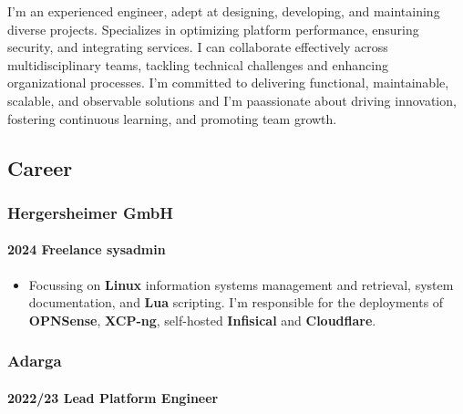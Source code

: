 \documentclass[
]{article}
\providecommand{\tightlist}{%
  \setlength{\itemsep}{0pt}\setlength{\parskip}{0pt}}
\begin{document}
I'm an experienced engineer, adept at designing, developing, and
maintaining diverse projects. Specializes in optimizing platform
performance, ensuring security, and integrating services. I can
collaborate effectively across multidisciplinary teams, tackling
technical challenges and enhancing organizational processes. I'm
committed to delivering functional, maintainable, scalable, and
observable solutions and I'm paassionate about driving innovation,
fostering continuous learning, and promoting team growth.

\hypertarget{material-briefcase-career}{%
\subsection{\texorpdfstring{\faBriefcase
Career}{ Career}}\label{material-briefcase-career}}

\hypertarget{material-office-building-hergersheimer-gmbh}{%
\subsubsection{\texorpdfstring{\faBuilding Hergersheimer
GmbH}{ Hergersheimer GmbH}}\label{material-office-building-hergersheimer-gmbh}}

\hypertarget{freelance-sysadmin}{%
\paragraph{2024 Freelance sysadmin}\label{freelance-sysadmin}}

\begin{itemize}
\tightlist
\item
  Focussing on \textbf{Linux} information systems management and
  retrieval, system documentation, and \textbf{Lua} scripting. I'm
  responsible for the deployments of \textbf{OPNSense}, \textbf{XCP-ng},
  self-hosted \textbf{Infisical} and \textbf{Cloudflare}.
\end{itemize}

\hypertarget{material-office-building-adarga}{%
\subsubsection{\texorpdfstring{\faBuilding
Adarga}{ Adarga}}\label{material-office-building-adarga}}

\hypertarget{lead-platform-engineer}{%
\paragraph{2022/23 Lead Platform
Engineer}\label{lead-platform-engineer}}
\end{document}
